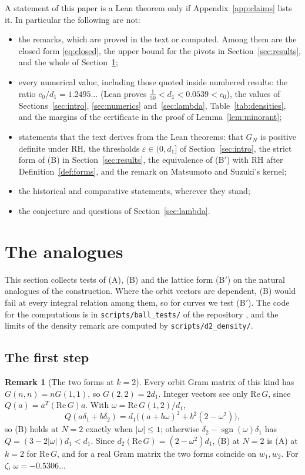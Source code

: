 \documentclass[11pt]{article}
\theoremstyle{definition}
\newtheorem*{remark}{Remark}
\begin{document}
A statement of this paper is a Lean theorem only if
Appendix~\ref{app:claims} lists it. In particular the following are not:
\begin{itemize}
\item the remarks, which are proved in the text or computed. Among them are the closed form \eqref{eq:closed}, the
upper bound for the pivots in Section~\ref{sec:results}, and the whole of Section~\ref{sec:analogues};
\item every numerical value, including those quoted inside numbered results: the ratio $c_0/d_1 = 1.2495\ldots$ (Lean
proves $\frac{1}{50} < d_1 < 0.0539 < c_0$), the values of Sections~\ref{sec:intro}, \ref{sec:numerics}
and~\ref{sec:lambda}, Table~\ref{tab:densities}, and the margins of the certificate in the proof of
Lemma~\ref{lem:minorant};
\item statements that the text derives from the Lean theorems: that $G_N$ is positive definite under RH, the
thresholds $\varepsilon \in (0, d_1]$ of Section~\ref{sec:intro}, the strict form of (B) in
Section~\ref{sec:results}, the equivalence of (B$'$) with RH after Definition~\ref{def:forms}, and the remark on
Matsumoto and Suzuki's kernel;
\item the historical and comparative statements, wherever they stand;
\item the conjecture and questions of Section~\ref{sec:lambda}.
\end{itemize}

\section{The analogues}\label{sec:analogues}

This section collects tests of (A), (B) and the lattice form (B$'$) on the natural analogues of the construction. Where
the orbit vectors are dependent, (B) would fail at every integral relation among them, so for curves we test (B$'$). The
code for the computations is in \texttt{scripts/ball\_tests/} of
the repository \cite{repo}, and the limits of the density remark
are computed by \texttt{scripts/d2\_density/}.

\subsection{The first step}

\begin{remark}[The two forms at $k = 2$]
Every orbit Gram matrix of this kind has $G(n, n) = nG(1, 1)$, so $G(2, 2) = 2d_1$. Integer vectors see only
$\mathrm{Re}\,G$,
since $Q(a) = a^T(\mathrm{Re}\,G)a$. With $\omega = \mathrm{Re}\,G(1, 2)/d_1$,
\[
Q(a\delta_1 + b\delta_2) = d_1\big((a + b\omega)^2 + b^2(2 - \omega^2)\big),
\]
so (B) holds at $N = 2$ exactly when $|\omega| \le 1$; otherwise
$\delta_2 - \operatorname{sgn}(\omega)\delta_1$ has $Q =
(3 - 2|\omega|)d_1 < d_1$. Since $d_2(\mathrm{Re}\,G) = (2 - \omega^2) d_1$, (B) at $N = 2$ is (A) at $k = 2$ for
$\mathrm{Re}\,G$, and for a real Gram matrix the two forms coincide on $w_1, w_2$. For $\zeta$, $\omega = -0.5306\ldots$
\end{remark}
\end{document}
